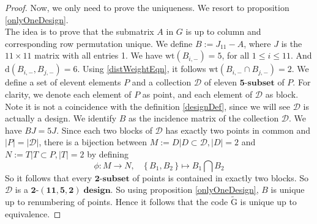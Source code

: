 \documentclass[12pt]{article}
\theoremstyle{definition}
\numberwithin{equation}{theorem}
\numberwithin{figure}{theorem}
\newcommand{\tParamDesign}[4]{\ensuremath{\bm{#1\mbox{-}(#2,#3,#4)\; design}}}
\newcommand{\dDes}{\ensuremath{\mathcal{D}}}
\newcommand{\cCodes}{\ensuremath{\widetilde{\mathrm{G}}}}
\newcommand{\tSubset}[1]{\ensuremath{\bm{#1\mbox{-}{subset}}}}
\newcommand{\wt}[1]{\ensuremath{\text{wt}(#1)}}
\newcommand{\dist}[2]{\ensuremath{\text{d}(#1,#2)}}
\begin{document}
\begin{proof}
Now, we only need to prove the uniqueness. We resort to proposition \ref{onlyOneDesign}.\\
The idea is to prove that the submatrix $A$ in $G$ is up to column and corresponding row permutation %
unique. We define $B := J_{11} - A$, where $J$ is the $11 \times 11$ matrix with all entries 1. We have $\wt{B_{i,-}} = 5$, for all $1 \leq i \leq 11$. And $\dist{B_{i,-}}{B_{j,-}} = 6$. Using \ref{distWeightEqn}, it follows $\wt{B_{i,-} \cap B_{j,-}} = 2$. We define a set of elevent elements $P$ and a collection {\dDes} of eleven {\tSubset{5}} of $P$. For clarity, we denote each element of $P$ as point, and each element of {\dDes} as block. Note it is not a coincidence with the definition \ref{designDef}, since we will see {\dDes} is actually a design. We identify $B$ as the incidence matrix of the collection {\dDes}. We have $BJ = 5J$. Since each two blocks of {\dDes} has exactly two points in common and $|P| = |\dDes|$, there is a bijection between $M  := {D| D \subset \dDes, |D| = 2}$ and $N := {T|T \subset P, |T| = 2}$ by defining 
\[
	\phi: M \rightarrow N, \quad \{\,B_1,B_2\,\} \mapsto B_1 \bigcap B_2
\]
So it follows that every {\tSubset{2}} of points is contained in exactly two blocks. So {\dDes} is a {\tParamDesign{2}{11}{5}{2}}. So using proposition \ref{onlyOneDesign}, $B$ is unique up to renumbering of points. Hence it follows that the code {\cCodes} is unique up to equivalence.
\end{proof}
\end{document}
